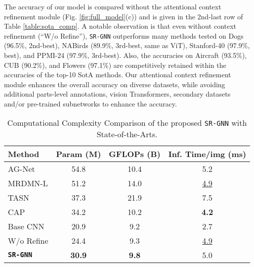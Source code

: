 \documentclass[journal]{IEEEtran}
\begin{document}
The accuracy of our model is compared without the attentional context refinement module (Fig. \ref{fig:full_model}(c)) and is given in the 2nd-last row of Table \ref{table:sota_comp}. A notable observation is that even without context refinement  (``W/o Refine''), \texttt{SR-GNN} outperforms many methods tested on Dogs (96.5\%, 2nd-best), NABirds (89.9\%, 3rd-best, same as ViT), Stanford-40 (97.9\%, best), and PPMI-24 (97.9\%, 3rd-best). Also, the accuracies on Aircraft (93.5\%), CUB (90.2\%), and Flowers (97.1\%)  are competitively retained within the accuracies of the top-10 SotA methods. Our attentional context refinement module enhances the overall accuracy on diverse datasets, while avoiding additional parts-level annotations, vision Transformers, secondary datasets and/or pre-trained subnetworks to enhance the accuracy. 
\vspace{ -0.4 cm}
\begin{table}[h]
\begin{center}
 \caption{Computational Complexity Comparison of the proposed \texttt{SR-GNN} with State-of-the-Arts.}
  \label{table:Complx2}
\begin{tabular}{|lccc|}
 \hline
Method & Param (M) & GFLOPs (B) & Inf. Time/img (ms) \\
    \hline
AG-Net \cite{bera2021attend} & 54.8 & 10.4 &5.2 \\
MRDMN-L \cite{xu2021multiresolution} & 51.2 &14.0 & \underline{4.9}\\
TASN \cite{zheng2019looking} & 37.3  &21.9 &7.5 \\
CAP \cite{behera2021context} & 34.2 &10.2 &\textbf{4.2}\\ 
\hline
Base CNN & 20.9 & 9.2 & 2.7\\
W/o Refine &  24.4 & 9.3 & \underline{4.9} \\
\textbf{\texttt{SR-GNN}}  &\textbf{30.9} & \textbf{9.8} & 5.0\\
\hline
\end{tabular}
 \end{center}
 \vspace{- 0.7 cm}
\end{table}
\end{document}

